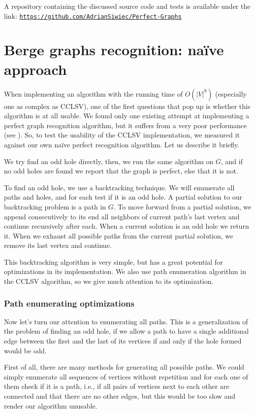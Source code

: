 A repository containing the discussed source code and tests is available under the link: \href{https://github.com/AdrianSiwiec/Perfect-Graphs}{\texttt{https://github.com/AdrianSiwiec/Perfect-Graphs}}


\section{Berge graphs recognition: na\"ive approach}
\label{sec:secnaive}
When implementing an algorithm with the running time of $O(|V|^9)$ (especially one as complex as CCLSV), one of the first questions that pop up is whether this algorithm is at all usable. We found only one existing attempt at implementing a perfect graph recognition algorithm, but it suffers from a very poor performance (see ). So, to test the usability of the CCLSV implementation, we measured it against our own na\"ive perfect recognition algorithm. Let us describe it briefly.

We try find an odd hole directly, then, we run the same algorithm on $\overline{G}$, and if no odd holes are found we report that the graph is perfect, else that it is not.

To find an odd hole, we use a backtracking technique. We will enumerate all paths and holes, and for each test if it is an odd hole. A partial solution to our backtracking problem is a path in $G$. To move forward from a partial solution, we append consecutively to its end all neighbors of current path's last vertex and continue recursively after each. When a current solution is an odd hole we return it. When we exhaust all possible paths from the current partial solution, we remove its last vertex and continue.

This backtracking algorithm is very simple, but has a great potential for optimizations in its implementation. We also use path enumeration algorithm in the CCLSV algorithm, so we give much attention to its optimization.

\subsubsection{Path enumerating optimizations}
Now let's turn our attention to enumerating all paths. This is a generalization of the problem of finding an odd hole, if we allow a path to have a single additional edge between the first and the last of its vertices if and only if the hole formed would be odd.

First of all, there are many methods for generating all possible paths. We could simply enumerate all sequences of vertices without repetition and for each one of them check if it is a path, i.e., if all pairs of vertices next to each other are connected and that there are no other edges, but this would be too slow and render our algorithm unusable.

